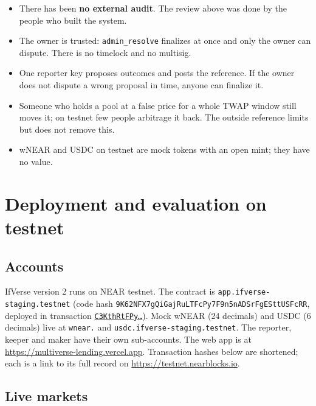 \documentclass[11pt,a4paper]{article}
\newcommand{\code}[1]{\texttt{\small #1}}
\newcommand{\tx}[2]{\href{https://testnet.nearblocks.io/txns/#1}{\code{#2\ldots}}}
\begin{document}
\begin{itemize}
\item There has been \textbf{no external audit}. The review above was done by the people who built the system.
\item The owner is trusted: \code{admin\_resolve} finalizes at once and only the owner can dispute. There is no
timelock and no multisig.
\item One reporter key proposes outcomes and posts the reference. If the owner does not dispute a wrong proposal in
time, anyone can finalize it.
\item Someone who holds a pool at a false price for a whole TWAP window still moves it; on testnet few people
arbitrage it back. The outside reference limits but does not remove this.
\item wNEAR and USDC on testnet are mock tokens with an open mint; they have no value.
\end{itemize}

\section{Deployment and evaluation on testnet}
\label{sec:eval}

\subsection{Accounts}

IfVerse version 2 runs on NEAR testnet. The contract is \code{app.ifverse-staging.testnet} (code hash
\code{9K62NFX7gQiGajRuLTFcPy7F9n5nADSrFgESttUSFcRR}, deployed in transaction
\tx{C3KthRtFPyJa68XRXNqBjvE6LpTqZfPgKsAo2U73bcpU}{C3KthRtFPy}). Mock wNEAR (24 decimals) and USDC (6 decimals) live at
\code{wnear.} and \code{usdc.ifverse-staging.testnet}. The reporter, keeper and maker have their own sub-accounts. The
web app is at \url{https://multiverse-lending.vercel.app}. Transaction hashes below are shortened; each is a link
to its full record on \url{https://testnet.nearblocks.io}.

\subsection{Live markets}
\end{document}
